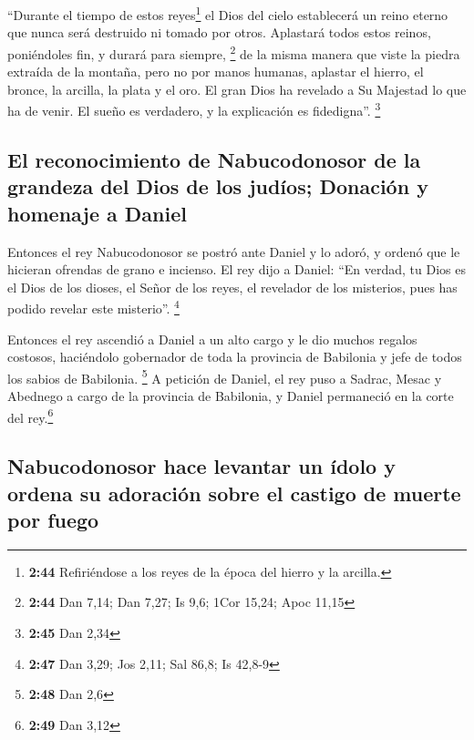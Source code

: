  ``Durante el tiempo de estos reyes\footnote{\textbf{2:44}
  Refiriéndose a los reyes de la época del hierro y la arcilla.} el Dios
del cielo establecerá un reino eterno que nunca será destruido ni tomado
por otros. Aplastará todos estos reinos, poniéndoles fin, y durará para
siempre, \footnote{\textbf{2:44} Dan 7,14; Dan 7,27; Is 9,6; 1Cor 15,24;
  Apoc 11,15}  de la misma manera que viste la piedra
extraída de la montaña, pero no por manos humanas, aplastar el hierro,
el bronce, la arcilla, la plata y el oro. El gran Dios ha revelado a Su
Majestad lo que ha de venir. El sueño es verdadero, y la explicación es
fidedigna''. \footnote{\textbf{2:45} Dan 2,34}

\hypertarget{el-reconocimiento-de-nabucodonosor-de-la-grandeza-del-dios-de-los-juduxedos-donaciuxf3n-y-homenaje-a-daniel}{%
\subsection{El reconocimiento de Nabucodonosor de la grandeza del Dios
de los judíos; Donación y homenaje a
Daniel}\label{el-reconocimiento-de-nabucodonosor-de-la-grandeza-del-dios-de-los-juduxedos-donaciuxf3n-y-homenaje-a-daniel}}

 Entonces el rey Nabucodonosor se postró ante Daniel y lo
adoró, y ordenó que le hicieran ofrendas de grano e incienso.
 El rey dijo a Daniel: ``En verdad, tu Dios es el Dios de
los dioses, el Señor de los reyes, el revelador de los misterios, pues
has podido revelar este misterio''. \footnote{\textbf{2:47} Dan 3,29;
  Jos 2,11; Sal 86,8; Is 42,8-9}

 Entonces el rey ascendió a Daniel a un alto cargo y le
dio muchos regalos costosos, haciéndolo gobernador de toda la provincia
de Babilonia y jefe de todos los sabios de Babilonia. \footnote{\textbf{2:48}
  Dan 2,6}  A petición de Daniel, el rey puso a Sadrac,
Mesac y Abednego a cargo de la provincia de Babilonia, y Daniel
permaneció en la corte del rey.\footnote{\textbf{2:49} Dan 3,12}

\hypertarget{nabucodonosor-hace-levantar-un-uxeddolo-y-ordena-su-adoraciuxf3n-sobre-el-castigo-de-muerte-por-fuego}{%
\subsection{Nabucodonosor hace levantar un ídolo y ordena su adoración
sobre el castigo de muerte por
fuego}\label{nabucodonosor-hace-levantar-un-uxeddolo-y-ordena-su-adoraciuxf3n-sobre-el-castigo-de-muerte-por-fuego}}

